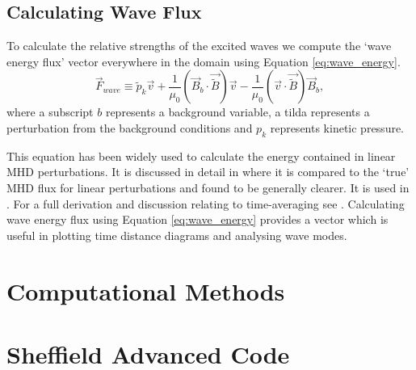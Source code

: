 \subsection{Calculating Wave Flux}\label{sec:waveflux}


To calculate the relative strengths of the excited waves we compute the `wave energy flux' vector everywhere in the domain using Equation \ref{eq:wave_energy}.
\begin{equation}
\vec{F}_{wave} \equiv \widetilde{p}_k \vec{v} + \frac{1}{\mu_0} \left(\vec{B}_b \cdot \vec{\widetilde{B}}\right) \vec{v} - \frac{1}{\mu_0}\left(\vec{v} \cdot \vec{\widetilde{B}} \right) \vec{B}_b,
\label{eq:wave_energy}
\end{equation}
where a subscript $b$ represents a background variable, a tilda represents a perturbation from the background conditions and $p_k$ represents kinetic pressure.

This equation has been widely used to calculate the energy contained in linear MHD perturbations.
It is discussed in detail in \cite{bogdan2003} where it is compared to the `true' MHD flux for linear perturbations and found to be generally clearer. 
It is used in \cite{vigeesh2009, vigeesh2012, khomenko2012}. 
For a full derivation and discussion relating to time-averaging see \cite{leroy1985}.
Calculating wave energy flux using Equation \ref{eq:wave_energy} provides a vector which is useful in plotting time distance diagrams and analysing wave modes.

\section{Computational Methods}\label{sec:numericalmethods}

\section{Sheffield Advanced Code}\label{sec:SAC}